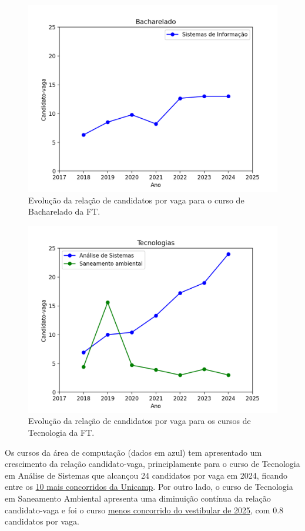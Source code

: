 \documentclass[
  letterpaper,
  DIV=11,
  numbers=noendperiod]{scrreprt}
\begin{document}
\begin{figure}[H]

{\centering \includegraphics[width=0.6\linewidth,height=\textheight,keepaspectratio]{motivacao/../dados/grafico-candidato-vaga-bacharelado.png}

}

\caption{Evolução da relação de candidatos por vaga para o curso de
Bacharelado da FT.}

\end{figure}%

\begin{figure}[H]

{\centering \includegraphics[width=0.6\linewidth,height=\textheight,keepaspectratio]{motivacao/../dados/grafico-candidato-vaga-tecnologia.png}

}

\caption{Evolução da relação de candidatos por vaga para os cursos de
Tecnologia da FT.}

\end{figure}%

Os cursos da área de computação (dados em azul) tem apresentado um
crescimento da relação candidato-vaga, principlamente para o curso de
Tecnologia em Análise de Sistemas que alcançou 24 candidatos por vaga em
2024, ficando entre os
\href{https://unicamp.br/noticias/2024/09/20/comvest-registra-63-mil-estudantes-inscritos-no-vestibular-2025/}{10
mais concorridos da Unicamp}. Por outro lado, o curso de Tecnologia em
Saneamento Ambiental apresenta uma diminuição contínua da relação
candidato-vaga e foi o curso
\href{https://educacao.uol.com.br/noticias/2025/02/10/vagas-sobrando-veja-os-cursos-menos-concorridos-na-usp-unicamp-e-ufrj.htm}{menos
concorrido do vestibular de 2025}, com 0.8 candidatos por vaga.
\end{document}
